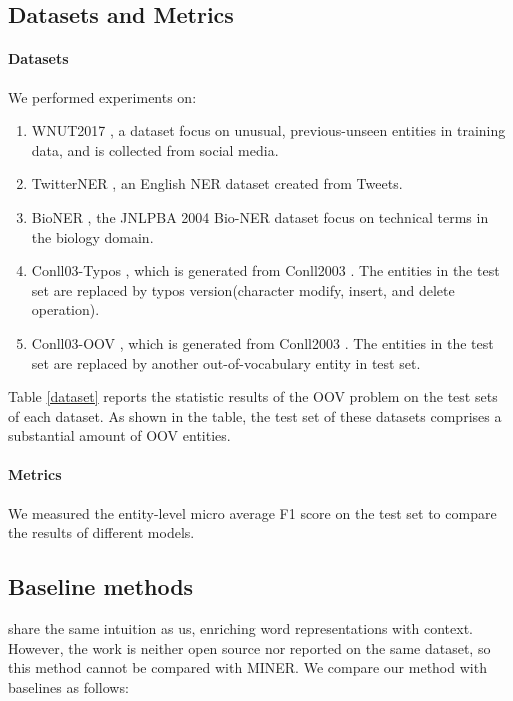 \documentclass[11pt]{article}
\begin{document}
\subsection{Datasets and Metrics}
\paragraph{Datasets} We performed experiments on: 

\begin{enumerate}
\item WNUT2017 \cite{derczynski2017results}, a dataset focus on unusual, previous-unseen entities in training data, and is collected from social media.

\item TwitterNER \cite{zhang2018adaptive}, an English NER dataset created from Tweets.

\item BioNER \cite{kim2004introduction}, the JNLPBA 2004 Bio-NER dataset focus on technical terms in the biology domain.

\item Conll03-Typos \cite{wang2021textflint}, which is generated from Conll2003 \cite{sang2003introduction}. The entities in the test set are replaced by typos version(character modify, insert, and delete operation).

\item Conll03-OOV \cite{wang2021textflint}, which is generated from Conll2003 \cite{sang2003introduction}. The entities in the test set are replaced by another out-of-vocabulary entity in test set.

\end{enumerate}

Table \ref{dataset} reports the statistic results of the OOV problem on the test sets of each dataset. As shown in the table, the test set of these datasets comprises a substantial amount of OOV entities.

\paragraph{Metrics} We measured the entity-level micro average F1 score on the test set to compare the results of different models.

\subsection{Baseline methods}
\citet{li-etal-2020-handling} share the same intuition as us, enriching word representations with context. However, the work is neither open source nor reported on the same dataset, so this method cannot be compared with MINER. We compare our method with baselines as follows:
\end{document}
